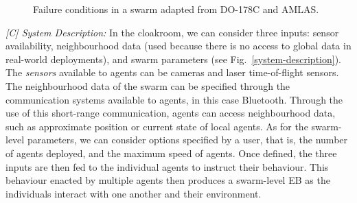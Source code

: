 \documentclass[runningheads]{llncs}
\begin{document}
\begin{figure}[!b]
\begin{minipage}[b]{.5\textwidth}
		\vspace{-4ex}%
		\caption{Failure conditions in a swarm adapted from DO-178C and AMLAS.}
		\label{failure-events}
	\end{minipage}
	\vspace{-7ex} %
\end{figure}

\emph{[C] System Description:}
In the cloakroom, we can consider three inputs: sensor availability, neighbourhood data (used because there is no access to global data in real-world deployments), and swarm parameters (see Fig.~\ref{system-description}). 
The \emph{sensors} available to agents can be cameras and laser time-of-flight sensors. 
The neighbourhood data of the swarm can be specified through the communication systems available to agents, in this case Bluetooth. 
Through the use of this short-range communication, agents can access neighbourhood data, such as approximate position or current state of local agents.  
As for the swarm-level parameters, we can consider options specified by a user, that is, the number of agents deployed, and the maximum speed of agents. 
Once defined, the three inputs are then fed to the individual agents to instruct their behaviour. This behaviour enacted by multiple agents then produces a swarm-level EB as the individuals interact with one another and their environment. 
\end{document}
